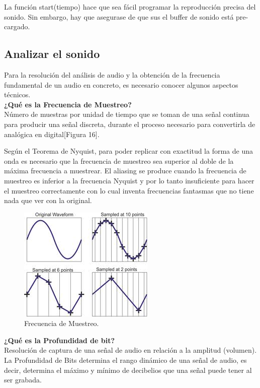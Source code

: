La función start(tiempo) hace que sea fácil programar la reproducción precisa del sonido. Sin embargo, hay que asegurase de que sus el buffer de sonido está pre-cargado.


\subsection{Analizar el sonido}
\label{sec:analizar_sonido}
Para la resolución del análisis de audio y la obtención de la frecuencia fundamental de un audio en concreto, es necesario conocer algunos aspectos técnicos.\\

\noindent\textbf{¿Qué es la Frecuencia de Muestreo?}\\
Número de muestras por unidad de tiempo que se toman de una señal continua para producir una señal discreta, durante el proceso necesario para convertirla de analógica en digital[Figura 16].


Según el Teorema de Nyquist, para poder replicar con exactitud la forma  de una onda es necesario que la frecuencia de muestreo sea superior al doble de la máxima frecuencia  a  muestrear.
El aliasing se produce cuando la frecuencia de muestreo es inferior a la frecuencia Nyquist y por lo tanto insuficiente para hacer  el muestreo correctamente con lo cual inventa frecuencias fantasmas que no tiene nada que ver con la original.\\

\begin{figure}[h]
 \centering
 \includegraphics[scale=0.7]{../images/muestreo.png}
 \caption{Frecuencia de Muestreo.}
 \label{fig:../images/muestreo.png}
 \end{figure}

\noindent\textbf{¿Qué es la Profundidad de bit?}\\
Resolución de captura de una señal de audio en relación a la amplitud (volumen). La Profundidad de Bits determina el rango dinámico de una señal de audio, es decir, determina el máximo y mínimo de decibelios que una señal puede tener al ser grabada.\\

